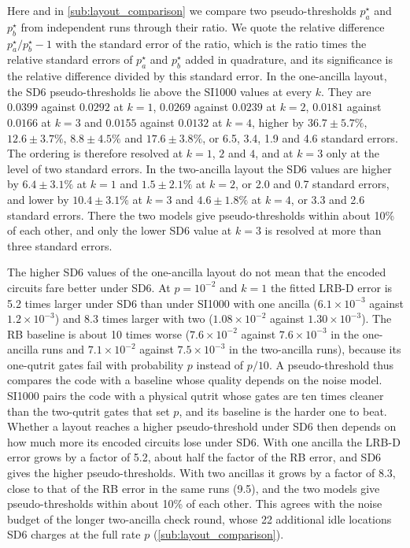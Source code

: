 Here and in \autoref{sub:layout_comparison} we compare two pseudo-thresholds $p^\star_a$ and $p^\star_b$ from independent runs through their ratio. We quote the relative difference $p^\star_a/p^\star_b - 1$ with the standard error of the ratio, which is the ratio times the relative standard errors of $p^\star_a$ and $p^\star_b$ added in quadrature, and its significance is the relative difference divided by this standard error. In the one-ancilla layout, the SD6 pseudo-thresholds lie above the SI1000 values at every $k$. They are $0.0399$ against $0.0292$ at $k = 1$, $0.0269$ against $0.0239$ at $k = 2$, $0.0181$ against $0.0166$ at $k = 3$ and $0.0155$ against $0.0132$ at $k = 4$, higher by $36.7 \pm 5.7\%$, $12.6 \pm 3.7\%$, $8.8 \pm 4.5\%$ and $17.6 \pm 3.8\%$, or 6.5, 3.4, 1.9 and 4.6 standard errors. The ordering is therefore resolved at $k = 1$, $2$ and $4$, and at $k = 3$ only at the level of two standard errors. In the two-ancilla layout the SD6 values are higher by $6.4 \pm 3.1\%$ at $k = 1$ and $1.5 \pm 2.1\%$ at $k = 2$, or 2.0 and 0.7 standard errors, and lower by $10.4 \pm 3.1\%$ at $k = 3$ and $4.6 \pm 1.8\%$ at $k = 4$, or 3.3 and 2.6 standard errors. There the two models give pseudo-thresholds within about 10\% of each other, and only the lower SD6 value at $k = 3$ is resolved at more than three standard errors.

The higher SD6 values of the one-ancilla layout do not mean that the encoded circuits fare better under SD6. At $p = 10^{-2}$ and $k = 1$ the fitted LRB-D error is 5.2 times larger under SD6 than under SI1000 with one ancilla ($6.1\times10^{-3}$ against $1.2\times10^{-3}$) and 8.3 times larger with two ($1.08\times10^{-2}$ against $1.30\times10^{-3}$). The RB baseline is about 10 times worse ($7.6\times10^{-2}$ against $7.6\times10^{-3}$ in the one-ancilla runs and $7.1\times10^{-2}$ against $7.5\times10^{-3}$ in the two-ancilla runs), because its one-qutrit gates fail with probability $p$ instead of $p/10$. A pseudo-threshold thus compares the code with a baseline whose quality depends on the noise model. SI1000 pairs the code with a physical qutrit whose gates are ten times cleaner than the two-qutrit gates that set $p$, and its baseline is the harder one to beat. Whether a layout reaches a higher pseudo-threshold under SD6 then depends on how much more its encoded circuits lose under SD6. With one ancilla the LRB-D error grows by a factor of 5.2, about half the factor of the RB error, and SD6 gives the higher pseudo-thresholds. With two ancillas it grows by a factor of 8.3, close to that of the RB error in the same runs (9.5), and the two models give pseudo-thresholds within about 10\% of each other. This agrees with the noise budget of the longer two-ancilla check round, whose 22 additional idle locations SD6 charges at the full rate $p$ (\autoref{sub:layout_comparison}).

